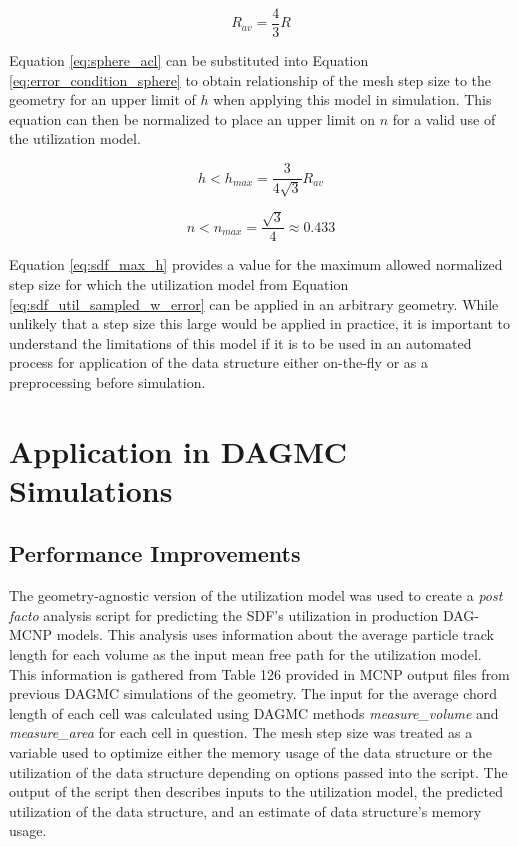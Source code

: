 \begin{equation}
  R_{av} = \frac{4}{3}R
  \label{eq:sphere_acl}
\end{equation}

Equation \eqref{eq:sphere_acl} can be substituted into Equation
\eqref{eq:error_condition_sphere} to obtain relationship of the mesh step size to
the geometry for an upper limit of $h$ when applying this model in
simulation. This equation can then be normalized to place an upper limit on $n$
for a valid use of the utilization model.

\begin{equation}
 h < h_{max} = \frac{3}{4\sqrt{3}} R_{av}
\end{equation}

\begin{equation}
 n < n_{max} = \frac{\sqrt{3}}{4} \approx 0.433
\label{eq:sdf_max_h}
\end{equation}

Equation \eqref{eq:sdf_max_h} provides a value for the maximum allowed normalized
step size for which the utilization model from Equation
\eqref{eq:sdf_util_sampled_w_error} can be applied in an arbitrary geometry. While
unlikely that a step size this large would be applied in practice, it is
important to understand the limitations of this model if it is to be used in an
automated process for application of the data structure either on-the-fly or as
a preprocessing before simulation.

\section{Application in DAGMC Simulations}\label{sec:sdf_production}

\subsection{Performance Improvements}

The geometry-agnostic version of the utilization model was used to create a
\textit{post facto} analysis script for predicting the SDF's utilization in
production DAG-MCNP models. This analysis uses information about the average
particle track length for each volume as the input mean free path for the
utilization model. This information is gathered from Table 126 provided in MCNP
output files from previous DAGMC simulations of the
geometry\cite{LANL_MCNP5_VOLIII}. The input for the average chord length of each
cell was calculated using DAGMC methods \textit{measure\_volume} and
\textit{measure\_area} for each cell in question. The mesh step size was treated
as a variable used to optimize either the memory usage of the data structure or
the utilization of the data structure depending on options passed into the
script. The output of the script then describes inputs to the utilization model,
the predicted utilization of the data structure, and an estimate of data
structure's memory usage.


